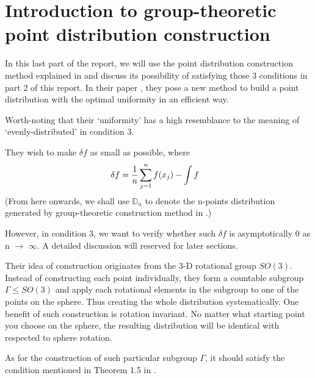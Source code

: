 \documentclass[12pt]{article}
\numberwithin{equation}{section}
\let\bb\mathbb
\let\bb\mathbb
\begin{document}
	\section{Introduction to group-theoretic point distribution construction}
	In this last part of the report, we will use the point distribution construction method explained in \cite{lubotzky_1986_hecke} and discuss its possibility of satisfying those 3 conditions in part 2 of this report.
	In their paper \cite{lubotzky_1986_hecke}, they pose a new method to build a point distribution with the optimal uniformity in an efficient way. \par 
	Worth-noting that their `uniformity' has a high resemblance to the meaning of `evenly-distributed' in condition 3. \par
	They wish to make $\delta f$ as small as possible, where 
	\[ \delta f = \frac{1}{n} \sum^n_{j=1}f(x_j)-\int f \hspace{3mm} \]
	(From here onwards, we shall use $\bb{D}_n$ to denote the n-points distribution generated by group-theoretic construction method in \cite{lubotzky_1986_hecke}.)\par 
	However, in condition 3, we want to verify whether such $\delta f$ is asymptotically 0 as n $\rightarrow$ $\infty$. A detailed discussion will reserved for later sections.\par 
	Their idea of construction originates from the 3-D rotational group $SO(3)$. Instead of constructing each point individually, they form a countable subgroup $\Gamma \leq SO(3)$ and apply each rotational elements in the subgroup to one of the points on the sphere. Thus creating the whole distribution systematically. One benefit of such construction is rotation invariant. No matter what starting point you choose on the sphere, the resulting distribution will be identical with respected to sphere rotation. \par 
	As for the construction of such particular subgroup $\Gamma $, it should satisfy the condition mentioned in Theorem 1.5 in \cite{lubotzky_1986_hecke}.
	
	\newpage
\end{document}
